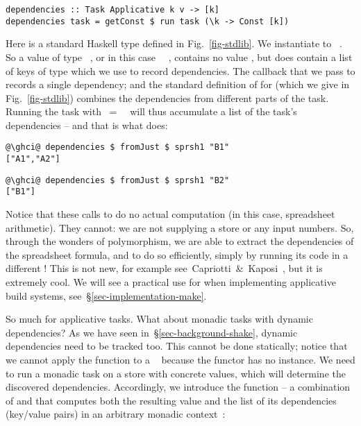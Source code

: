 \vspace{1mm}
\begin{verbatim}
dependencies :: Task Applicative k v -> [k]
dependencies task = getConst $ run task (\k -> Const [k])
\end{verbatim}
\vspace{1mm}

\noindent
Here  is a standard Haskell type defined in Fig.~\ref{fig-stdlib}. We
instantiate  to ~\hs{[@@k]}. So a value of type ~,
or in this case ~\hs{[@@k]}~, contains no value , but does
contain a list of keys of type \hs{[@@k]} which we use to record dependencies.
The  callback that we pass to  records a single dependency;
and the standard definition of  for  (which we give
in Fig.~\ref{fig-stdlib}) combines the dependencies from different parts of the
task. Running the task with ~=~~\hs{[@@k]} will thus
accumulate a list of the task's dependencies -- and that is what
 does:
\vspace{1mm}
\begin{verbatim}
@\ghci@ dependencies $ fromJust $ sprsh1 "B1"
["A1","A2"]
\end{verbatim}
\begin{verbatim}
@\ghci@ dependencies $ fromJust $ sprsh1 "B2"
["B1"]
\end{verbatim}
\vspace{1mm}

\noindent
Notice that these calls to  do no actual computation (in this
case, spreadsheet arithmetic). They cannot: we are not supplying a store or any
input numbers. So, through the wonders of polymorphism, we are able to extract
the dependencies of the spreadsheet formula, and to do so efficiently, simply by
running its code in a different ! This is not new, for example
see~Capriotti~\&~Kaposi~, but it is extremely cool.
We will see a practical use for  when implementing applicative
build systems, see~\S\ref{sec-implementation-make}.

So much for applicative tasks. What about monadic tasks with dynamic
dependencies? As we have seen in~\S\ref{sec-background-shake}, dynamic
dependencies need to be tracked too. This cannot be done statically; notice that
we cannot apply the function  to a ~ because
the  functor has no  instance. We need to run a monadic task
on a store with concrete values, which will determine the discovered
dependencies. Accordingly, we introduce the function  -- a combination
of  and  that computes both the resulting value and
the list of its dependencies (key/value pairs) in an arbitrary monadic
context~:

